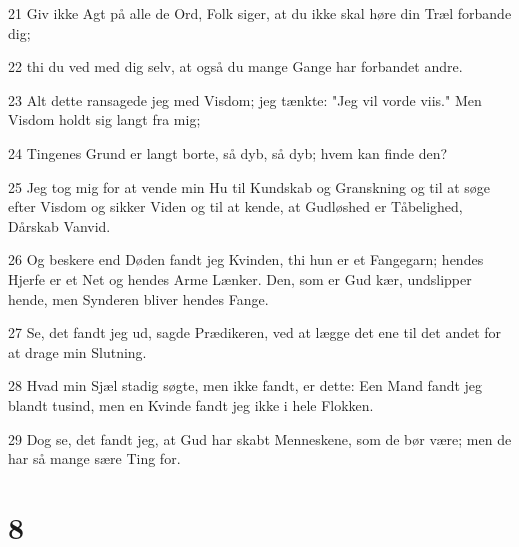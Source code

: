 \par 21 Giv ikke Agt på alle de Ord, Folk siger, at du ikke skal høre din Træl forbande dig;
\par 22 thi du ved med dig selv, at også du mange Gange har forbandet andre.
\par 23 Alt dette ransagede jeg med Visdom; jeg tænkte: "Jeg vil vorde viis." Men Visdom holdt sig langt fra mig;
\par 24 Tingenes Grund er langt borte, så dyb, så dyb; hvem kan finde den?
\par 25 Jeg tog mig for at vende min Hu til Kundskab og Granskning og til at søge efter Visdom og sikker Viden og til at kende, at Gudløshed er Tåbelighed, Dårskab Vanvid.
\par 26 Og beskere end Døden fandt jeg Kvinden, thi hun er et Fangegarn; hendes Hjerfe er et Net og hendes Arme Lænker. Den, som er Gud kær, undslipper hende, men Synderen bliver hendes Fange.
\par 27 Se, det fandt jeg ud, sagde Prædikeren, ved at lægge det ene til det andet for at drage min Slutning.
\par 28 Hvad min Sjæl stadig søgte, men ikke fandt, er dette: Een Mand fandt jeg blandt tusind, men en Kvinde fandt jeg ikke i hele Flokken.
\par 29 Dog se, det fandt jeg, at Gud har skabt Menneskene, som de bør være; men de har så mange sære Ting for.

\chapter{8}

